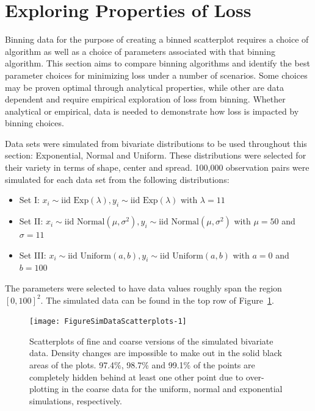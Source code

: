 \documentclass[11pt]{isuthesis}\usepackage[]{graphicx}\usepackage[]{color}
\newenvironment{knitrout}{}{} %
\begin{document}

\section{Exploring Properties of Loss}

Binning data for the purpose of creating a binned scatterplot requires a choice of algorithm as well as a choice of parameters associated with that binning algorithm.  This section aims to compare binning algorithms and identify the best parameter choices for minimizing loss under a number of scenarios. Some choices may be proven optimal through analytical properties, while other are data dependent and require empirical exploration of loss from binning.  Whether analytical or empirical, data is needed to demonstrate how loss is impacted by binning choices.

Data sets were simulated from bivariate distributions to be used throughout this section: Exponential, Normal and Uniform.  These distributions were selected for their variety in terms of shape, center and spread. 100,000 observation pairs were simulated for each data set from the following distributions: 

\begin{itemize}
\item Set I: $x_i \sim \text{iid Exp}(\lambda), y_i \sim \text{iid Exp}(\lambda)$ with $\lambda = 11$

\item Set II: $x_i \sim \text{iid Normal}(\mu,\sigma^2), y_i \sim \text{iid Normal}(\mu,\sigma^2)$ with $\mu = 50$ and $\sigma=11$

\item Set III: $x_i \sim \text{iid Uniform}(a,b), y_i \sim \text{iid Uniform}(a,b)$ with $a =0$ and $b=100$
\end{itemize}
%
The parameters were selected to have data values roughly span the region $[0,100]^2$. The simulated data can be found in the top row of Figure~\ref{fig:SimDataScatterplots}. 

\begin{knitrout}
\color{fgcolor}\begin{figure}[h]

{\centering \texttt{[image: FigureSimDataScatterplots-1]} 

}

\caption[Scatterplots of fine and coarse versions of the simulated bivariate data]{Scatterplots of fine and coarse versions of the simulated bivariate data. Density changes are impossible to make out in the solid black areas of the plots. 97.4\%, 98.7\% and 99.1\% of the points are completely hidden behind at least one other point due to over-plotting in the coarse data for the uniform, normal and exponential simulations, respectively.}\label{fig:SimDataScatterplots}
\end{figure}


\end{knitrout}
\end{document}

